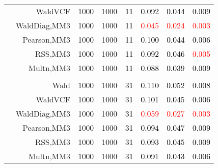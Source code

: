 \documentclass[
]{article}
\begin{document}
\begin{table}[H]
{\begin{tabular}[t]{lrrrrrrr}
\hspace{1em} & WaldVCF & 1000 & 1000 & 11 & \textcolor{black}{0.092} & \textcolor{black}{0.044} & \textcolor{black}{0.009}\\

\hspace{1em} & WaldDiag,MM3 & 1000 & 1000 & 11 & \textcolor{red}{0.045} & \textcolor{red}{0.024} & \textcolor{red}{0.003}\\

\hspace{1em} & Pearson,MM3 & 1000 & 1000 & 11 & \textcolor{black}{0.100} & \textcolor{black}{0.044} & \textcolor{black}{0.006}\\

\hspace{1em} & RSS,MM3 & 1000 & 1000 & 11 & \textcolor{black}{0.092} & \textcolor{black}{0.046} & \textcolor{red}{0.005}\\

\hspace{1em} & Multn,MM3 & 1000 & 1000 & 11 & \textcolor{black}{0.088} & \textcolor{black}{0.039} & \textcolor{black}{0.009}\\
\cmidrule{1-8}
\addlinespace[0.3em]
\multicolumn{8}{l}{\textbf{3F 15V}}\\
\hspace{1em} & Wald & 1000 & 1000 & 31 & \textcolor{black}{0.110} & \textcolor{black}{0.052} & \textcolor{black}{0.008}\\

\hspace{1em} & WaldVCF & 1000 & 1000 & 31 & \textcolor{black}{0.101} & \textcolor{black}{0.045} & \textcolor{black}{0.006}\\

\hspace{1em} & WaldDiag,MM3 & 1000 & 1000 & 31 & \textcolor{red}{0.059} & \textcolor{red}{0.027} & \textcolor{red}{0.003}\\

\hspace{1em} & Pearson,MM3 & 1000 & 1000 & 31 & \textcolor{black}{0.094} & \textcolor{black}{0.047} & \textcolor{black}{0.009}\\

\hspace{1em} & RSS,MM3 & 1000 & 1000 & 31 & \textcolor{black}{0.093} & \textcolor{black}{0.045} & \textcolor{black}{0.009}\\

\hspace{1em} & Multn,MM3 & 1000 & 1000 & 31 & \textcolor{black}{0.091} & \textcolor{black}{0.043} & \textcolor{black}{0.006}\\
\bottomrule
\end{tabular}}
\endgroup{}
\end{table}
\end{document}

